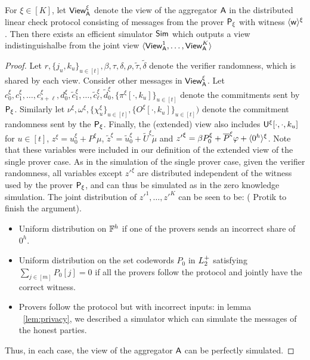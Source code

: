 \begin{lemma}\label{lem:distlincheckzk}
For $\xi\in [K]$, let $\mathsf{View}^\xi_{\mathsf{A}}$ denote the view of the aggregator $\mathsf{A}$ in the distributed
linear check protocol consisting of messages from the prover $\mathsf{P}_\xi$ with
witness $\langle{\mathsf{w}}\rangle^\xi$. Then there exists an efficient simulator $\mathsf{Sim}$
which outputs a view indistinguishalbe from the joint view $\langle
\mathsf{View}^1_{\mathsf{A}},\ldots,\mathsf{View}^K_{\mathsf{A}}\rangle$ 
\end{lemma}
\begin{proof}

Let $r,\{j_u,k_u\}_{u\in
[t]},\beta,\tau,\delta,\rho,\tilde{\tau},\tilde{\delta}$ denote the verifier
randomness, which is shared by each view. Consider other messages in
$\mathsf{View}^\xi_{\mathsf{A}}$. Let 
$c_0^\xi,c_1^\xi,\ldots,c_{s+\ell}^\xi,d_0^\xi,\tilde{c}_1^\xi,\ldots,\tilde{c}_\ell^\xi,\tilde{d}_0^\xi,\{\pi^\xi[\cdot,k_u]\}_{u\in
[t]}$ denote the commitments sent by $\mathsf{P}_\xi$. Similarly let 
$\nu^\xi,\omega^\xi,\{\chi^\xi_u\}_{u\in [t]},\{O^\xi[\cdot,k_u]\}_{u\in [t]})$
denote the commitment randomness sent by the $\mathsf{P}_\xi$. Finally, the
(extended) view also includes $\mathsf{U}^\xi[\cdot,\cdot,k_u]$ for $u\in [t]$,
$z^\xi=u_0^\xi+P^\xi\mu$,
$\tilde{z}^\xi=\tilde{u}^\xi_0+\tilde{U}^\xi\tilde{\mu}$ and ${z'}^\xi=\beta
P^\xi_0 + \overline{P}^\xi\varphi + \langle{0^h}\rangle^\xi$. Note that these variables were
included in our definition of the extended view of the single prover case. As in the simulation of the
single prover case, given the verifier randomness, all variables except
${z'}^\xi$ are distributed independent of the witness used by the prover
$\mathsf{P}_\xi$, and can thus be simulated as in the zero knowledge simulation.
The joint distribution of ${z'}^1,\ldots,{z'}^K$ can be seen to be:
({\color{red} Protik to finish the argument}).
\begin{itemize}
\item Uniform distribution on $\mathbb{F}^h$ if one of the provers sends an incorrect
share of $0^h$.
\item Uniform distribution on the set codewords $P_0$ in $L^{+}_2$ satisfying
$\sum_{j\in [m]}P_0[j]=0$ if all the provers follow the protocol and
jointly have the correct witness.
\item Provers follow the protocol but with incorrect inputs: in lemma ~\ref{lem:privacy}, we described a simulator which can simulate the messages of the honest parties. 
\end{itemize}

Thus, in each case, the view of the aggregator $\mathsf{A}$ can be perfectly simulated.
\end{proof}
